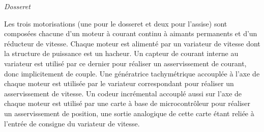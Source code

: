\documentclass[10pt,fleqn]{article} %
\begin{document}
\begin{multicols}{2}
\begin{center}
\textit{Dosseret \label{fig2}}
\end{center}




Les trois motorisations (une pour le dosseret et deux pour l'assise)
sont composées chacune d'un moteur à courant continu à aimants
permanents et d'un réducteur de vitesse. Chaque moteur est alimenté par
un variateur de vitesse dont la structure de puissance est un hacheur.
Un capteur de courant interne au variateur est utilisé par ce dernier pour réaliser un asservissement de courant, donc implicitement de couple. Une génératrice tachymétrique accouplée
à l'axe de chaque moteur est utilisée par le variateur correspondant
pour réaliser un asservissement de vitesse. Un codeur incrémental
accouplé aussi sur l'axe de chaque moteur est utilisé par une carte à
base de microcontrôleur pour réaliser un asservissement de position, une
sortie analogique de cette carte étant reliée à l'entrée de consigne du
variateur de vitesse.
%
%
%



\end{multicols}
\end{document}
